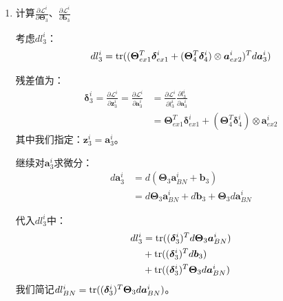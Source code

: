 \documentclass[12pt, a4paper]{article}
\newcommand{\imat}{\bm}
\newcommand{\ivec}{\bm}
\newcommand{\tr}{{\rm tr}}
\newcommand{\loss}{\mathcal{L}}
\newcommand{\thetam}{\imat{\Theta}}
\newcommand{\deltav}{\ivec{\delta}}
\newcommand{\av}{\ivec{a}}
\newcommand{\bv}{\ivec{b}}
\newcommand{\zv}{\ivec{z}}
\begin{document}
\begin{enumerate}
            得到梯度:
            \begin{align*}
            \frac{\partial \loss^i}{\partial \thetam_{ex1}} &= \deltav_{ex1}^i (\av_3^i)^T \\
            \frac{\partial \loss^i}{\partial \bv_{ex1}} &= \deltav_{ex1}^i
            \end{align*}

            对$\loss^i$求和：
            \begin{align}
            \frac{\partial \loss}{\partial \thetam_{ex1}} &= \frac{1}{m} \sum_{i=1}^{m} \deltav_{ex1}^i (\av_3^i)^T \\
            \frac{\partial \loss}{\partial \bv_{ex1}} &= \frac{1}{m} \sum_{i=1}^{m} \deltav_{ex1}^i
            \end{align}

        \item 计算$\frac{\partial \loss^i}{\partial \thetam_3}$、$\frac{\partial \loss^i}{\partial \bv_3}$

            考虑$d l_3^i$：
            \begin{align*}
            d l_3^i = \tr((\thetam_{ex1}^T \deltav_{ex1}^i + (\thetam_4^T \deltav_4^i) \otimes \av_{ex2}^i)^T d \av_3^i)
            \end{align*}

            残差值为：
            \begin{equation}\begin{aligned}
            \deltav_3^i = \frac{\partial \loss^i}{\partial \zv_3^i} = \frac{\partial \loss^i}{\partial \av_3^i}
            &= \frac{\partial \loss^i}{\partial l_3^i} \frac{\partial l_3^i}{\partial \av_3^i} \\
            &= \thetam_{ex1}^T \deltav_{ex1}^i + (\thetam_4^T \deltav_4^i) \otimes \av_{ex2}^i
            \end{aligned}\end{equation}
            其中我们指定：$\zv_3^i = \av_3^i$。

            继续对$\av_3^i$求微分：
            \begin{align*}
            d \av_3^i
            &= d (\thetam_3 \av_{BN}^i + \bv_3) \\
            &= d \thetam_3 \av_{BN}^i + d \bv_3 + \thetam_3 d \av_{BN}^i
            \end{align*}

            代入$d l_3^i$中：
            \begin{align*}
            d l_3^i &= \tr((\deltav_3^i)^T d \thetam_3 \av_{BN}^i) \\
                        &+ \tr((\deltav_3^i)^T d \bv_3) \\
                        &+ \tr((\deltav_3^i)^T \thetam_3 d \av_{BN}^i)
            \end{align*}
            我们简记$d l_{BN}^i = \tr((\deltav_3^i)^T \thetam_3 d \av_{BN}^i)$。


\end{enumerate}
\end{document}
